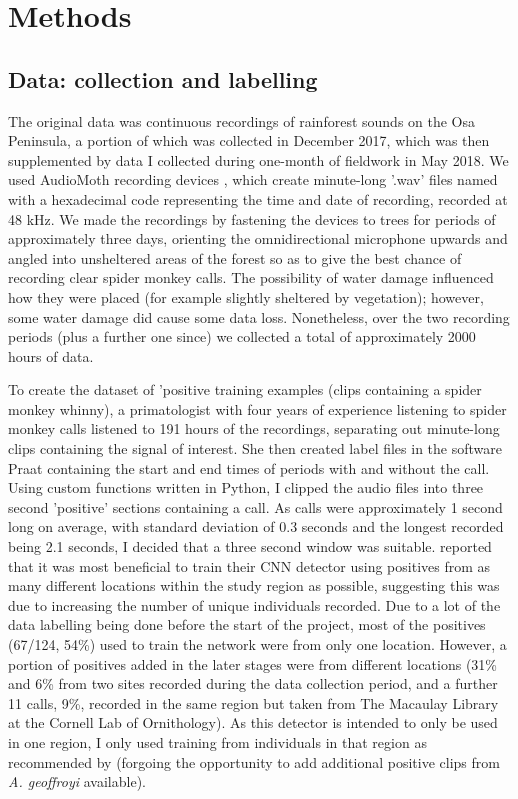 \documentclass[11pt]{article}
\begin{document}
\section{Methods} 

\subsection{Data: collection and labelling}

The original data was continuous recordings of rainforest sounds on the Osa Peninsula, a portion of which was collected in December 2017, which was then supplemented by data I collected during one-month of fieldwork in May 2018. We used AudioMoth recording devices \citep{hill2018audiomoth}, which create minute-long '.wav' files named with a hexadecimal code representing the time and date of recording, recorded at 48 kHz. We made the recordings by fastening the devices to trees for periods of approximately three days, orienting the omnidirectional microphone upwards and angled into unsheltered areas of the forest so as to give the best chance of recording clear spider monkey calls. The possibility of water damage influenced how they were placed (for example slightly sheltered by vegetation); however, some water damage did cause some data loss. Nonetheless, over the two recording periods (plus a further one since) we collected a total of approximately 2000 hours of data.

To create the dataset of 'positive training examples (clips containing a spider monkey whinny), a primatologist with four years of experience listening to spider monkey calls listened to 191 hours of the recordings, separating out minute-long clips containing the signal of interest. She then created label files in the software Praat \citep{praat} containing the start and end times of periods with and without the call. Using custom functions written in Python, I clipped the audio files into three second 'positive' sections containing a call. As calls were approximately 1 second long on average, with standard deviation of 0.3 seconds and the longest recorded being 2.1 seconds, I decided that a three second window was suitable. \cite{crump2017designing} reported that it was most beneficial to train their CNN detector using positives from as many different locations within the study region as possible, suggesting this was due to increasing the number of unique individuals recorded. Due to a lot of the data labelling being done before the start of the project, most of the positives (67/124, 54\%) used to train the network were from only one location. However, a portion of positives added in the later stages were from different locations (31\% and 6\% from two sites recorded during the data collection period, and a further 11 calls, 9\%, recorded in the same region but taken from The Macaulay Library at the Cornell Lab of Ornithology). As this detector is intended to only be used in one region, I only used training from individuals in that region as recommended by \cite{knight2017recommendations} (forgoing the opportunity to add additional positive clips from \textit{A. geoffroyi} available).
\end{document}
